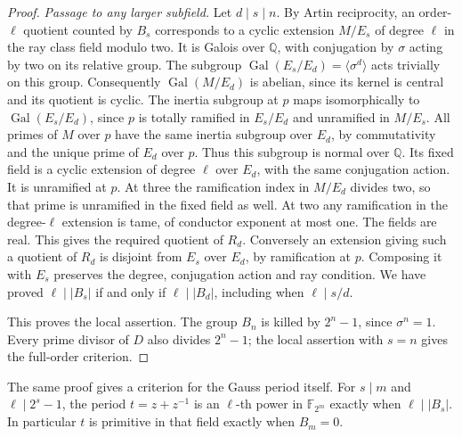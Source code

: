 \documentclass[11pt]{article}
\begin{document}
\begin{proof}
\emph{Passage to any larger subfield.}
Let \(d\mid s\mid n\). By Artin reciprocity, an order-\(\ell\)
quotient counted by \(B_s\) corresponds to a cyclic extension
\(M/E_s\) of degree \(\ell\) in the ray class field modulo two.
It is Galois over \(\mathbb Q\), with conjugation by \(\sigma\)
acting by two on its relative group. The subgroup
\(\operatorname{Gal}(E_s/E_d)=\langle\sigma^d\rangle\) acts
trivially on this group. Consequently \(\operatorname{Gal}(M/E_d)\)
is abelian, since its kernel is central and its quotient is cyclic.
The inertia subgroup at \(p\) maps isomorphically to
\(\operatorname{Gal}(E_s/E_d)\), since \(p\) is totally ramified
in \(E_s/E_d\) and unramified in \(M/E_s\). All primes of \(M\)
over \(p\) have the same inertia subgroup over \(E_d\), by
commutativity and the unique prime of \(E_d\) over \(p\).
Thus this subgroup is normal over \(\mathbb Q\). Its fixed field
is a cyclic extension of degree \(\ell\) over \(E_d\), with the
same conjugation action. It is unramified at \(p\). At three the
ramification index in \(M/E_d\) divides two, so that prime is
unramified in the fixed field as well. At two any ramification
in the degree-\(\ell\) extension is tame, of conductor exponent
at most one. The fields are real. This gives the required quotient
of \(R_d\). Conversely an extension giving such a quotient of
\(R_d\) is disjoint from \(E_s\) over \(E_d\), by ramification
at \(p\). Composing it with \(E_s\) preserves the degree,
conjugation action and ray condition. We have proved
\(\ell\mid |B_s|\) if and only if \(\ell\mid |B_d|\), including
when \(\ell\mid s/d\).

This proves the local assertion. The group \(B_n\) is killed by
\(2^n-1\), since \(\sigma^n=1\). Every prime divisor of \(D\)
also divides \(2^n-1\); the local assertion with \(s=n\) gives
the full-order criterion.
\end{proof}

The same proof gives a criterion for the Gauss period itself.
For \(s\mid m\) and \(\ell\mid2^s-1\), the period \(t=z+z^{-1}\)
is an \(\ell\)-th power in \(\mathbb F_{2^m}\) exactly when
\(\ell\mid |B_s|\). In particular \(t\) is primitive in that
field exactly when \(B_m=0\).
\end{document}
